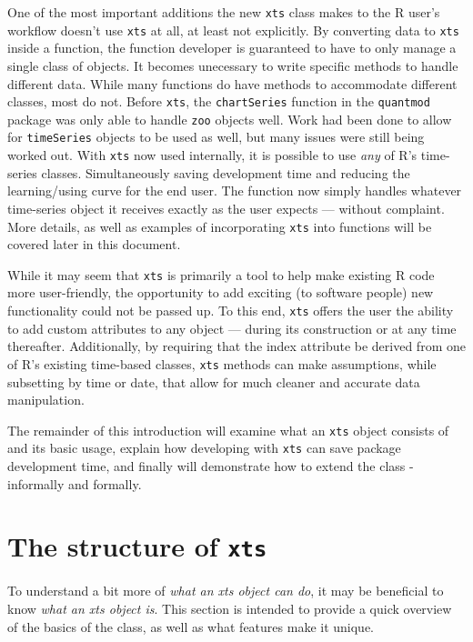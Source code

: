 \documentclass{article}
\begin{document}
One of the most important additions the new {\tt xts} class makes
to the R user's
workflow doesn't use {\tt xts} at all, at least not explicitly.
By converting data to {\tt xts} inside a function, the function developer
is guaranteed to have to only manage a single class of objects. 
It becomes unecessary to write specific methods to handle different data.
While many functions do have
methods to accommodate different classes, most do not. Before {\tt xts}, the
{\tt chartSeries} function in the {\tt quantmod} package\cite{quantmod}
was only able to handle {\tt zoo} objects well.
Work had been done to allow for {\tt timeSeries} objects to be used as well, but
many issues were still being worked out.
With {\tt xts} now used internally, it is
possible to use \emph{any} of R's time-series classes.
Simultaneously saving development time and
reducing the learning/using curve for the end user.  The function now
simply handles whatever time-series object it receives
exactly as the user expects --- without complaint.
More details, as well as examples of incorporating {\tt xts} into
functions will be covered later in this document.

While it may seem that {\tt xts} is primarily a tool
to help make existing R code
more user-friendly, the opportunity to add exciting
(to software people) new functionality
could not be passed up.  To this end, {\tt xts} 
offers the user the ability to add
custom attributes to any object --- during its construction
or at any time thereafter.  Additionally,
by requiring that the index attribute be derived from one of
R's existing time-based classes, {\tt xts} methods can
make assumptions, while subsetting by time or date, that allow for
much cleaner and accurate data manipulation.

The remainder of this introduction will
examine what an {\tt xts} object consists of and
its basic usage, explain how developing with {\tt xts} can save
package development time, and finally will demonstrate
how to extend the class - informally
and formally.

\pagebreak
\section{The structure of {\tt xts}}
To understand a bit more of \emph{what an xts object can do}, it may
be beneficial to know \emph{what an xts object is}. This section
is intended to provide a quick overview of the basics of the
class, as well as what features make it unique.
\end{document}
